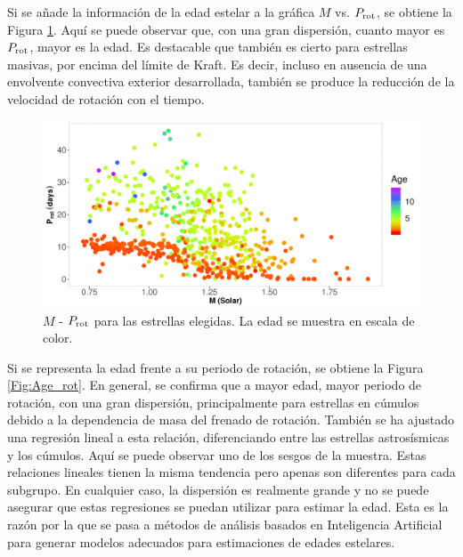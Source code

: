Si se añade la información de la edad estelar a la gráfica $M$ vs. $P_{\rm rot}$, se obtiene la Figura \ref{Fig:M_Age_rot}. Aquí se puede observar que, con una gran dispersión, cuanto mayor es $P_{\rm rot}$, mayor es la edad. Es destacable que también es cierto para estrellas masivas, por encima del límite de Kraft. Es decir, incluso en ausencia de una envolvente convectiva exterior desarrollada, también se produce la reducción de la velocidad de rotación con el tiempo.

\begin{figure}[H]
\begin{center}
 \includegraphics[width=0.8\linewidth]{Figuras/M_Prot_Age_embedded.pdf}
\end{center}
\caption{$M$ - $P_{\rm rot}$ para las estrellas elegidas. La edad se muestra en escala de color.}
 \label{Fig:M_Age_rot}
\end{figure}

Si se representa la edad frente a su periodo de rotación, se obtiene la Figura \ref{Fig:Age_rot}. En general, se confirma que a mayor edad, mayor periodo de rotación, con una gran dispersión, principalmente para estrellas en cúmulos debido a la dependencia de masa del frenado de rotación. También se ha ajustado una regresión lineal a esta relación, diferenciando entre las estrellas astrosísmicas y los cúmulos. Aquí se puede observar uno de los sesgos de la muestra. Estas relaciones lineales tienen la misma tendencia pero apenas son diferentes para cada subgrupo. En cualquier caso, la dispersión es realmente grande y no se puede asegurar que estas regresiones se puedan utilizar para estimar la edad. Esta es la razón por la que se pasa a métodos de análisis basados en Inteligencia Artificial para generar modelos adecuados para estimaciones de edades estelares.

